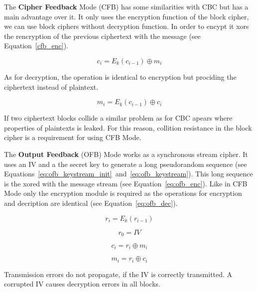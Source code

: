 The \textbf{Cipher Feedback} Mode (CFB) has some similarities with CBC but has a main advantage over it.
It only uses the encryption function of the block cipher, we can use block ciphers without decryption function.
In order to encypt it xors the rencryption of the previous ciphertext with the message (see Equation~\ref{cfb_enc}).

\begin{equation}
  c_i = E_k(c_{i-1}) \oplus m_i
  \label{eq:cfb_enc}
\end{equation}

As for decryption, the operation is identical to encryption but prociding the ciphertext instead of plaintext.

\begin{equation}
  m_i = E_k(c_{i-1}) \oplus c_i
  \label{eq:cfb_enc}
\end{equation}

If two ciphertext blocks collide a similar problem as for CBC apears where properties of plaintexts is leaked.
For this reason, collition resistance in the block cipher is a requirement for using CFB Mode.

The \textbf{Output Feedback} (OFB) Mode works as a synchronous stream cipher.
It uses an IV and a the secret key to generate a long pseudorandom sequence (see Equations~\ref{eq:ofb_keystream_init}~and~\ref{eq:ofb_keystream}).
This long sequence is the xored with the message stream (see Equation~\ref{eq:ofb_enc}).
Like in CFB Mode only the encryption module is required as the operations for encryption and decription are identical (see Equation~\ref{eq:ofb_dec}).

\begin{equation}
  r_i = E_k(r_{i-1})
  \label{eq:ofb_keystream}
\end{equation}

\begin{equation}
  r_0 = IV
  \label{eq:ofb_keystream_init}
\end{equation}

\begin{equation}
  c_i = r_i \oplus m_i
  \label{eq:ofb_enc}
\end{equation}

\begin{equation}
  m_i = r_i \oplus c_i
  \label{eq:ofb_dec}
\end{equation}

Transmission errors do not propagate, if the IV is correctly transmitted. A corrupted IV causes decryption errors in all blocks.

